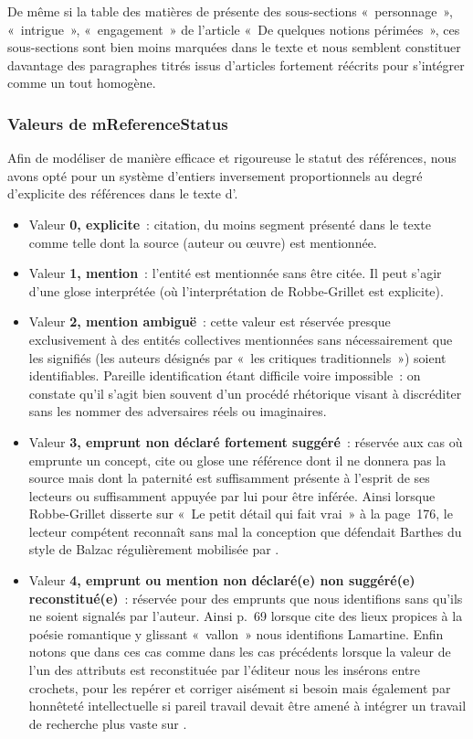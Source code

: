 De même si la table des matières de \punr{} présente des sous-sections «~personnage~», «~intrigue~», «~engagement~» de l'article «~De quelques notions périmées~», ces sous-sections sont bien moins marquées dans le texte et nous semblent constituer davantage des paragraphes titrés issus d'articles fortement réécrits pour s'intégrer comme un tout homogène.



\subsubsection{Valeurs de mReferenceStatus}
Afin de modéliser de manière efficace et rigoureuse le statut des références, nous avons opté pour un système d'entiers inversement proportionnels au degré d'explicite des références dans le texte d'\robbe.

\begin{itemize}
    \item Valeur \textbf{0, explicite}~: citation, du moins segment présenté dans le texte comme telle dont la source (auteur ou œuvre) est mentionnée.
    \item Valeur \textbf{1, mention}~: l'entité est mentionnée sans être citée. Il peut s'agir d'une glose interprétée (où l'interprétation de Robbe-Grillet est explicite).
    \item Valeur \textbf{2, mention ambiguë}~: cette valeur est réservée presque exclusivement à des entités collectives mentionnées sans nécessairement que les signifiés (les auteurs désignés par «~les critiques traditionnels~») soient identifiables. Pareille identification étant difficile voire impossible~: on constate qu'il s'agit bien souvent d'un procédé rhétorique visant à discréditer sans les nommer des adversaires réels ou imaginaires.
    \item Valeur \textbf{3, emprunt non déclaré fortement suggéré}~: réservée aux cas où \robbe{} emprunte un concept, cite ou glose une référence dont il ne donnera pas la source mais dont la paternité est suffisamment présente à l'esprit de ses lecteurs ou suffisamment appuyée par lui pour être inférée. Ainsi lorsque Robbe-Grillet disserte sur «~Le petit détail qui fait vrai~» à la page~176, le lecteur compétent reconnaît sans mal la conception que défendait Barthes du style de Balzac régulièrement mobilisée par \robbe.
    \item Valeur \textbf{4, emprunt ou mention non déclaré(e) non suggéré(e) reconstitué(e)}~: réservée pour des emprunts que nous identifions sans qu'ils ne soient signalés par l'auteur. Ainsi p.~69 lorsque \robbe{} cite des lieux propices à la poésie romantique y glissant «~vallon~» nous identifions Lamartine. Enfin notons que dans ces cas comme dans les cas précédents lorsque la valeur de l'un des attributs est reconstituée par l'éditeur nous les insérons entre crochets, pour les repérer et corriger aisément si besoin mais également par honnêteté intellectuelle si pareil travail devait être amené à intégrer un travail de recherche plus vaste sur \punr{}.
\end{itemize}

